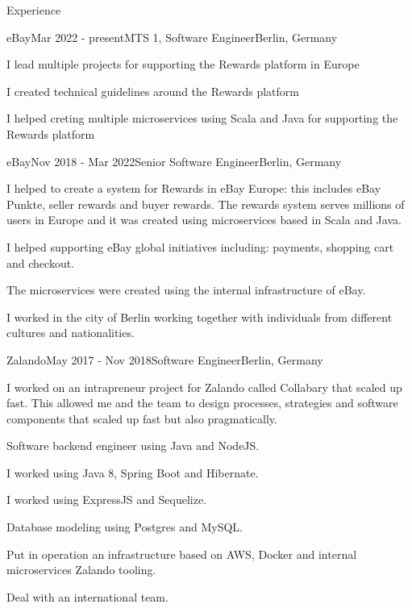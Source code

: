 \documentclass[spanish]{resume}
\begin{document}
\begin{rSection}{Experience}

\begin{rSubsection}{eBay}{Mar 2022 - present}{MTS 1, Software Engineer}{Berlin, Germany}
\item I lead multiple projects for supporting the Rewards platform in Europe
\item I created technical guidelines around the Rewards platform
\item I helped creting multiple microservices using Scala and Java for supporting the Rewards platform


\end{rSubsection}


\begin{rSubsection}{eBay}{Nov 2018 - Mar 2022}{Senior Software Engineer}{Berlin, Germany}
\item I helped to create a system for Rewards in eBay Europe: this includes eBay Punkte, seller rewards and buyer rewards. The rewards system serves millions of users in Europe and it was created using microservices based in Scala and Java.
\item I helped supporting eBay global initiatives including: payments, shopping cart and checkout.
\item The microservices were created using the internal infrastructure of eBay.
\item I worked in the city of Berlin working together with individuals from different cultures and nationalities.
\end{rSubsection}


\begin{rSubsection}{Zalando}{May 2017 - Nov 2018}{Software Engineer}{Berlin, Germany}
\item I worked on an intrapreneur project for Zalando called Collabary that scaled up fast. This allowed me and the team to design processes, strategies and software components that scaled up fast but also pragmatically.
\item Software backend engineer using Java and NodeJS.
\item I worked using Java 8, Spring Boot and Hibernate.
\item I worked using ExpressJS and Sequelize.
\item Database modeling using Postgres and MySQL.
\item Put in operation an infrastructure based on AWS, Docker and internal microservices Zalando tooling.
\item Deal with an international team.
\end{rSubsection}



\end{rSection}
\end{document}
